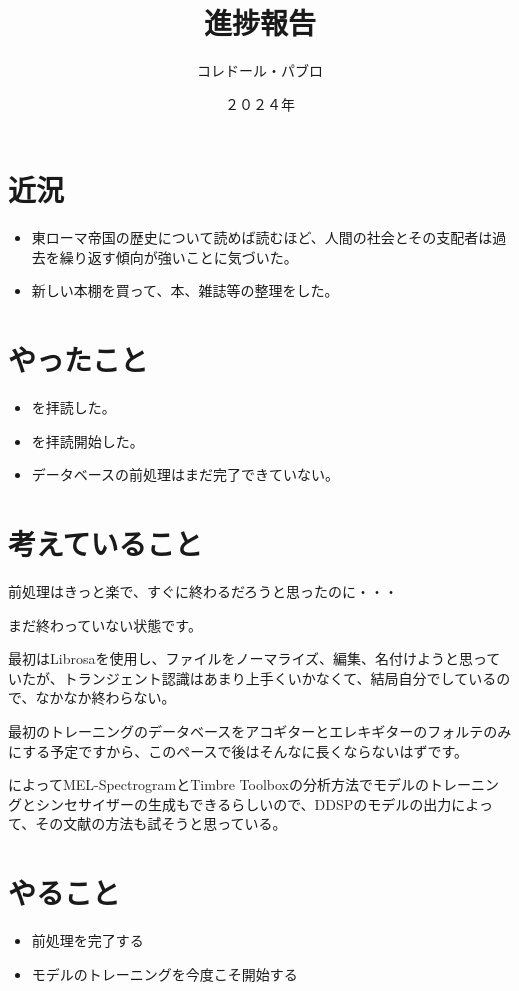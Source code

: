 \documentclass[a4paper, 12pt]{article}
\title{進捗報告}
\author{コレドール・パブロ}
\date{２０２４年}
\begin{document}
\maketitle

\section*{近況}
\begin{itemize}
    \item 東ローマ帝国の歴史について読めば読むほど、人間の社会とその支配者は過去を繰り返す傾向が強いことに気づいた。
    \item 新しい本棚を買って、本、雑誌等の整理をした。
\end{itemize} 

\section*{やったこと}
\begin{itemize}
    \item \cite{latentSpaceInterpolation}を拝読した。
    \item \cite{TimbreToolbox}を拝読開始した。
    \item データベースの前処理はまだ完了できていない。
\end{itemize}

\section*{考えていること}

前処理はきっと楽で、すぐに終わるだろうと思ったのに・・・

まだ終わっていない状態です。

最初はLibrosaを使用し、ファイルをノーマライズ、編集、名付けようと思っていたが、トランジェント認識はあまり上手くいかなくて、結局自分でしているので、なかなか終わらない。

最初のトレーニングのデータベースをアコギターとエレキギターのフォルテのみにする予定ですから、このペースで後はそんなに長くならないはずです。

\cite{latentSpaceInterpolation}によってMEL-SpectrogramとTimbre Toolbox\cite{TimbreToolbox}の分析方法でモデルのトレーニングとシンセサイザーの生成もできるらしいので、DDSPのモデルの出力によって、その文献の方法も試そうと思っている。

\section*{やること}
\begin{itemize}
    \item 前処理を完了する
    \item モデルのトレーニングを今度こそ開始する
\end{itemize}



\end{document}
